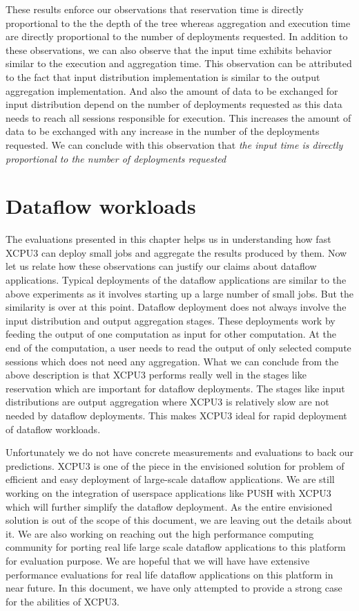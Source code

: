 These results enforce our observations that reservation time is directly
proportional to the the depth of the tree whereas aggregation and execution time
are directly proportional to the number of deployments requested.  In addition
to these observations, we can also observe that the input time exhibits 
behavior similar to the execution and aggregation time.  This observation can be
attributed to the fact that input distribution implementation is similar
to the output aggregation implementation.  And also the amount of data to be
exchanged for input distribution depend on the number of deployments requested
as this data needs to reach all sessions responsible for execution.  This
increases the amount of data to be exchanged with any increase in the number of
the deployments requested.  We can conclude with this observation that
\textit{the input time is directly proportional to the number of deployments
requested}


\section{Dataflow workloads}
The evaluations presented in this chapter helps us in understanding how fast
XCPU3 can deploy small jobs and aggregate the results produced by them.  Now
let us relate how these observations can justify our claims about dataflow
applications. Typical deployments of the dataflow applications are similar to
the above experiments as it involves starting up a large number of small jobs.
But the similarity is over at this point. Dataflow deployment does not always
involve the input distribution and output aggregation stages.  These deployments
work by feeding the output of one computation as input for other computation. 
At the end of the computation, a user needs to read the output of only selected
compute sessions which does not need any aggregation.  What we can conclude from
the above description is that XCPU3 performs really well in the stages like
reservation which are important for dataflow deployments.  The stages like input
distributions are output aggregation where XCPU3 is relatively slow are not
needed by dataflow deployments.  This makes XCPU3 ideal for rapid deployment of
dataflow workloads.

Unfortunately we do not have concrete measurements and evaluations to back our
predictions.  XCPU3 is one of the piece in the envisioned solution for  problem
of efficient and easy deployment of large-scale dataflow applications.   We are
still working on the integration of userspace applications like PUSH with XCPU3
which will further simplify the dataflow deployment. As the entire envisioned
solution is out of the scope of this document, we are leaving out the details
about it.  We are also working on reaching out the high performance computing
community for porting real life large scale dataflow applications to this
platform for evaluation purpose. We are hopeful that we will have have extensive
performance evaluations for real life dataflow applications on this platform in
near future.  In this document, we have only attempted to provide a strong case
for the abilities of XCPU3.


